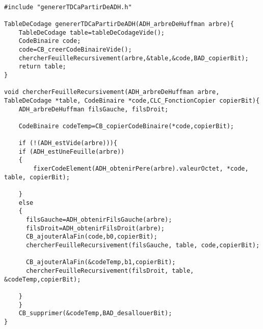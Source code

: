 \begin{verbatim}

#include "genererTDCaPartirDeADH.h"

TableDeCodage genererTDCaPartirDeADH(ADH_arbreDeHuffman arbre){
    TableDeCodage table=tableDeCodageVide();
    CodeBinaire code;
    code=CB_creerCodeBinaireVide();
    chercherFeuilleRecursivement(arbre,&table,&code,BAD_copierBit);
    return table;
}

void chercherFeuilleRecursivement(ADH_arbreDeHuffman arbre, TableDeCodage *table, CodeBinaire *code,CLC_FonctionCopier copierBit){
    ADH_arbreDeHuffman filsGauche, filsDroit;

    CodeBinaire codeTemp=CB_copierCodeBinaire(*code,copierBit);

    if (!(ADH_estVide(arbre))){
    if (ADH_estUneFeuille(arbre))
    {
        fixerCodeElement(ADH_obtenirPere(arbre).valeurOctet, *code, table, copierBit);

    }
    else
    {
      filsGauche=ADH_obtenirFilsGauche(arbre);
      filsDroit=ADH_obtenirFilsDroit(arbre);
      CB_ajouterAlaFin(code,b0,copierBit);
      chercherFeuilleRecursivement(filsGauche, table, code,copierBit);
  
      CB_ajouterAlaFin(&codeTemp,b1,copierBit);
      chercherFeuilleRecursivement(filsDroit, table, &codeTemp,copierBit);
    
    }
	}
	CB_supprimer(&codeTemp,BAD_desallouerBit);
}

\end{verbatim}
 
